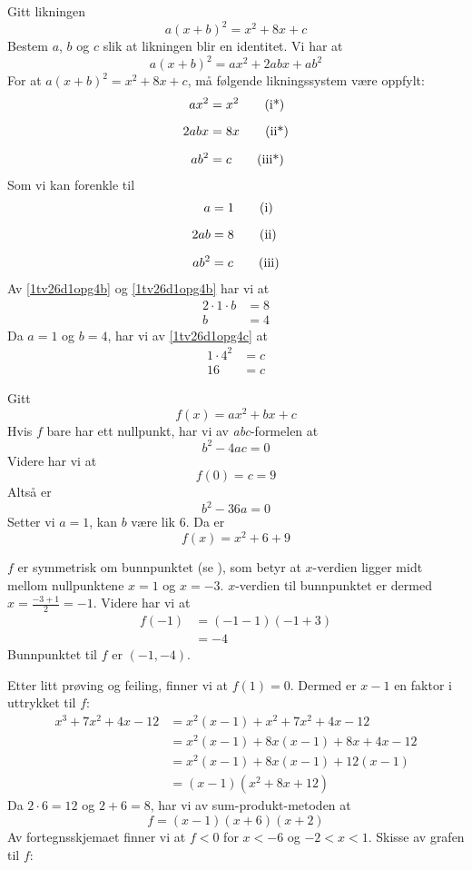 Gitt likningen
\[ a(x+b)^2=x^2+8x+c \]
Bestem $a$, $b$ og $c$ slik at likningen blir en identitet.
Vi har at 
\[ a(x+b)^2=ax^2+2abx+ab^2 \]
For at $a(x+b)^2=x^2+8x+c$, må følgende likningssystem være oppfylt:
\begin{align*}
	ax^2 &= x^2 \tag{i*} \label{1tv26d1opg4a} \vn
	2abx &= 8x \tag{ii*} \label{1tv26d1opg4b} \vn
	ab^2 &= c \tag{iii*} \label{1tv26d1opg4c}
\end{align*}
Som vi kan forenkle til
\begin{align*}
	a &= 1 \tag{i} \label{1tv26d1opg4a} \vn
	2ab &= 8 \tag{ii} \label{1tv26d1opg4b} \vn
	ab^2 &= c \tag{iii} \label{1tv26d1opg4c}
\end{align*}
Av \eqref{1tv26d1opg4b} og \eqref{1tv26d1opg4b} har vi at 
\begin{align*}
	2\cdot1\cdot b &= 8 \\
	b &= 4
\end{align*}
Da $a=1$ og $b=4$, har vi av \eqref{1tv26d1opg4c} at
\begin{align*}
	1\cdot 4^2 &= c \\
	16 &= c
\end{align*}

Gitt
\[ f(x)=ax^2+bx+c \]
Hvis $f$ bare har ett nullpunkt, har vi av \textit{abc}-formelen at
\[ b^2-4ac=0 \]
Videre har vi at
\[ f(0)=c=9 \]
Altså er
\[ b^2-36a=0 \]
Setter vi $a=1$, kan $b$ være lik 6. Da er
\[ f(x)=x^2+6+9 \]

$f$ er symmetrisk om bunnpunktet (se ), som betyr at $x$-verdien ligger midt mellom nullpunktene $x=1$ og $x=-3$. $x$-verdien til bunnpunktet er dermed $x=\frac{-3+1}{2}=-1$. Videre har vi at
\begin{align*}
	f(-1)&=(-1-1)(-1+3) \\
	&= -4
\end{align*} 
Bunnpunktet til $f$ er $(-1, -4)$.

\newpage
{}
Etter litt prøving og feiling, finner vi at $f(1)=0$. Dermed er $x-1$ en faktor i uttrykket til $f$:
\begin{align*}
	x^3+7x^2+4x-12 &= x^2(x-1)+x^2+7x^2+4x-12 \\
	&=x^2(x-1)+8x(x-1)+8x+4x-12 \\
	&=x^2(x-1)+8x(x-1)+12(x-1) \\
	&=(x-1)(x^2+8x+12)
\end{align*}
Da $2\cdot6=12$ og $2+6=8$, har vi av sum-produkt-metoden at
\[ f=(x-1)(x+6)(x+2) \]
Av fortegnsskjemaet finner vi at $f<0$ for $x<-6$ og $-2<x<1$.
Skisse av grafen til $f$:

